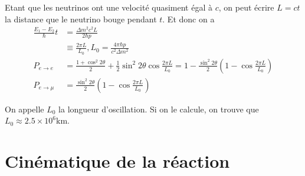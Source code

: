 \documentclass[10pt]{report}
\newcommand{\scinot}[2]{#1\times 10^{#2}}
\begin{document}
Etant que les neutrinos ont une velocit\'e quasiment \'egal \`a $c$, on peut \'ecrire $L = ct$ la distance que le neutrino bouge pendant $t$. Et donc on a
\begin{align}
    \frac{E_1 - E_2}{\hbar}t &= \frac{\Delta m^2 c^2L}{2\hbar p} \\
    &\equiv \frac{2\pi L}{L_0}, L_0 = \frac{4\pi\hbar p}{c^2 \Delta m^2}\\
    P_{e \to e} &= \frac{1 + \cos^2 2\theta}{2} + \frac{1}{2}\sin^2 2\theta \cos \frac{2\pi L}{L_0} = 1 - \frac{\sin^2 2\theta}{2} \left( 1 - \cos \frac{2\pi L}{L_0} \right)\\
    P_{e \to \mu} &= \frac{\sin^2 2\theta}{2}\left( 1 - \cos \frac{2\pi L}{L_0} \right)
\end{align}

On appelle $L_0$ la longueur d'oscillation. Si on le calcule, on trouve que $L_0 \approx \scinot{2.5}{6}\mathrm{km}$.

\section{Cin\'ematique de la r\'eaction}
\end{document}
